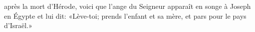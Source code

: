\encetemps après la mort d’Hérode,
	voici que l’ange du Seigneur apparaît en songe à Joseph en Égypte
	et lui dit: «Lève-toi;
	prends l’enfant et sa mère, et pars pour le pays d’Israël.»
